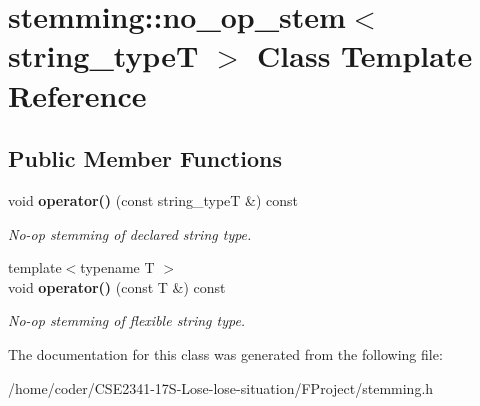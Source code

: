 \section{stemming\+:\+:no\+\_\+op\+\_\+stem$<$ string\+\_\+typeT $>$ Class Template Reference}
\label{classstemming_1_1no__op__stem}
\subsection*{Public Member Functions}
\begin{DoxyCompactItemize}
\item 
void {\bf operator()} (const string\+\_\+typeT \&) const \label{classstemming_1_1no__op__stem_a5e95ea3afb739e7bea6b14a3e9150c89}

\begin{DoxyCompactList}\small\item\em No-\/op stemming of declared string type. \end{DoxyCompactList}\item 
{\footnotesize template$<$typename T $>$ }\\void {\bf operator()} (const T \&) const \label{classstemming_1_1no__op__stem_a8109dda5e97b7c138f9aa9ec9ea4ee9f}

\begin{DoxyCompactList}\small\item\em No-\/op stemming of flexible string type. \end{DoxyCompactList}\end{DoxyCompactItemize}


The documentation for this class was generated from the following file\+:\begin{DoxyCompactItemize}
\item 
/home/coder/\+C\+S\+E2341-\/17\+S-\/\+Lose-\/lose-\/situation/\+F\+Project/stemming.\+h\end{DoxyCompactItemize}
